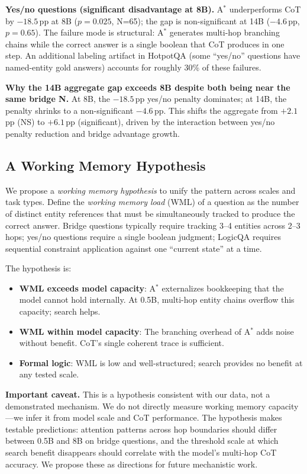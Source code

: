 \documentclass{article}
\newcommand{\astar}{A$^*$\xspace}
\begin{document}
\textbf{Yes/no questions (significant disadvantage at 8B).}
\astar underperforms CoT by $-18.5$\,pp at 8B ($p=0.025$, N=65); the gap is non-significant at 14B ($-4.6$\,pp, $p=0.65$).
The failure mode is structural: \astar generates multi-hop branching chains while the correct answer is a single boolean that CoT produces in one step.
An additional labeling artifact in HotpotQA (some ``yes/no'' questions have named-entity gold answers) accounts for roughly 30\% of these failures.

\textbf{Why the 14B aggregate gap exceeds 8B despite both being near the same bridge N.}
At 8B, the $-18.5$\,pp yes/no penalty dominates; at 14B, the penalty shrinks to a non-significant $-4.6$\,pp.
This shifts the aggregate from $+2.1$\,pp (NS) to $+6.1$\,pp (significant), driven by the interaction between yes/no penalty reduction and bridge advantage growth.

\subsection{A Working Memory Hypothesis}
\label{sec:working_memory}

We propose a \emph{working memory hypothesis} to unify the pattern across scales and task types.
Define the \emph{working memory load} (WML) of a question as the number of distinct entity references that must be simultaneously tracked to produce the correct answer.
Bridge questions typically require tracking 3--4 entities across 2--3 hops; yes/no questions require a single boolean judgment; LogicQA requires sequential constraint application against one ``current state'' at a time.

The hypothesis is:

\begin{itemize}[leftmargin=*, noitemsep]
  \item \textbf{WML exceeds model capacity}: \astar externalizes bookkeeping that the model cannot hold internally. At 0.5B, multi-hop entity chains overflow this capacity; search helps.
  \item \textbf{WML within model capacity}: The branching overhead of \astar adds noise without benefit. CoT's single coherent trace is sufficient.
  \item \textbf{Formal logic}: WML is low and well-structured; search provides no benefit at any tested scale.
\end{itemize}

\textbf{Important caveat.}
This is a hypothesis consistent with our data, not a demonstrated mechanism.
We do not directly measure working memory capacity---we infer it from model scale and CoT performance.
The hypothesis makes testable predictions: attention patterns across hop boundaries should differ between 0.5B and 8B on bridge questions, and the threshold scale at which search benefit disappears should correlate with the model's multi-hop CoT accuracy.
We propose these as directions for future mechanistic work.
\end{document}
